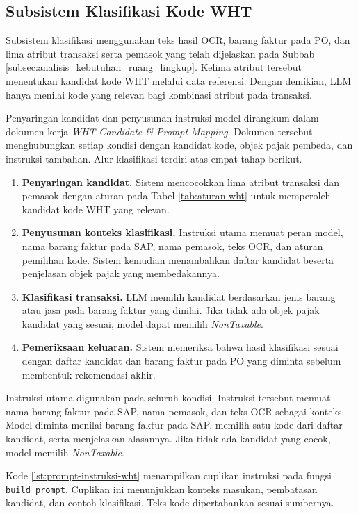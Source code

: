 \subsection{Subsistem Klasifikasi Kode WHT}
\label{subsec:hasil-klasifikasi-wht}

Subsistem klasifikasi menggunakan teks hasil OCR, barang faktur pada PO, dan lima atribut transaksi serta pemasok yang telah dijelaskan pada Subbab \ref{subsec:analisis_kebutuhan_ruang_lingkup}. Kelima atribut tersebut menentukan kandidat kode WHT melalui data referensi. Dengan demikian, LLM hanya menilai kode yang relevan bagi kombinasi atribut pada transaksi.

Penyaringan kandidat dan penyusunan instruksi model dirangkum dalam dokumen kerja \textit{WHT Candidate \& Prompt Mapping}. Dokumen tersebut menghubungkan setiap kondisi dengan kandidat kode, objek pajak pembeda, dan instruksi tambahan. Alur klasifikasi terdiri atas empat tahap berikut.
\begin{enumerate}
    \item \textbf{Penyaringan kandidat.} Sistem mencocokkan lima atribut transaksi dan pemasok dengan aturan pada Tabel \ref{tab:aturan-wht} untuk memperoleh kandidat kode WHT yang relevan.
    \item \textbf{Penyusunan konteks klasifikasi.} Instruksi utama memuat peran model, nama barang faktur pada SAP, nama pemasok, teks OCR, dan aturan pemilihan kode. Sistem kemudian menambahkan daftar kandidat beserta penjelasan objek pajak yang membedakannya.
    \item \textbf{Klasifikasi transaksi.} LLM memilih kandidat berdasarkan jenis barang atau jasa pada barang faktur yang dinilai. Jika tidak ada objek pajak kandidat yang sesuai, model dapat memilih \textit{NonTaxable}.
    \item \textbf{Pemeriksaan keluaran.} Sistem memeriksa bahwa hasil klasifikasi sesuai dengan daftar kandidat dan barang faktur pada PO yang diminta sebelum membentuk rekomendasi akhir.
\end{enumerate}

Instruksi utama digunakan pada seluruh kondisi. Instruksi tersebut memuat nama barang faktur pada SAP, nama pemasok, dan teks OCR sebagai konteks. Model diminta menilai barang faktur pada SAP, memilih satu kode dari daftar kandidat, serta menjelaskan alasannya. Jika tidak ada kandidat yang cocok, model memilih \textit{NonTaxable}.

Kode \ref{lst:prompt-instruksi-wht} menampilkan cuplikan instruksi pada fungsi \texttt{build\_prompt}. Cuplikan ini menunjukkan konteks masukan, pembatasan kandidat, dan contoh klasifikasi. Teks kode dipertahankan sesuai sumbernya.

